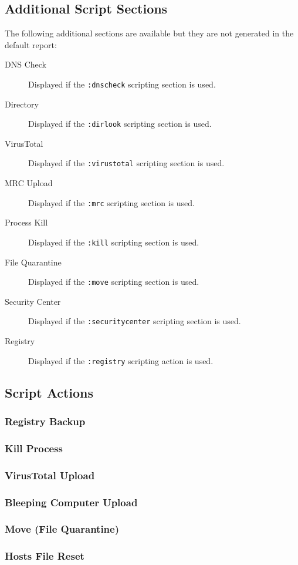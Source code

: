 \subsection{Additional Script Sections}
\noindent{}The following additional sections are available but they are not
generated in the default report:
\begin{description}
\item[DNS Check] Displayed if the \verb|:dnscheck| scripting section is used.
\item[Directory] Displayed if the \verb|:dirlook| scripting section is used.
\item[VirusTotal] Displayed if the \verb|:virustotal| scripting section is used.
\item[MRC Upload] Displayed if the \verb|:mrc| scripting section is used.
\item[Process Kill] Displayed if the \verb|:kill| scripting section is used.
\item[File Quarantine] Displayed if the \verb|:move| scripting section is used.
\item[Security Center] Displayed if the \verb|:securitycenter| scripting section
is used.
\item[Registry] Displayed if the \verb|:registry| scripting action is used.
\end{description}

\subsection{Script Actions}
\subsubsection{Registry Backup}
\subsubsection{Kill Process}
\subsubsection{VirusTotal Upload}
\subsubsection{Bleeping Computer Upload}
\subsubsection{Move (File Quarantine)}
\subsubsection{Hosts File Reset}

